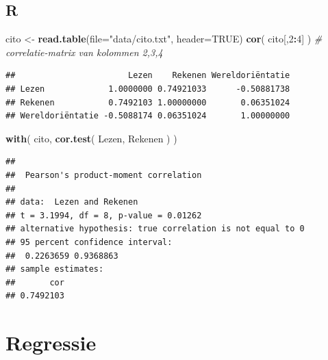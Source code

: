 \documentclass[
]{book}
\newenvironment{Shaded}{\begin{snugshade}}{\end{snugshade}}
\newcommand{\AttributeTok}[1]{\textcolor[rgb]{0.13,0.29,0.53}{#1}}
\newcommand{\CommentTok}[1]{\textcolor[rgb]{0.56,0.35,0.01}{\textit{#1}}}
\newcommand{\ConstantTok}[1]{\textcolor[rgb]{0.56,0.35,0.01}{#1}}
\newcommand{\DecValTok}[1]{\textcolor[rgb]{0.00,0.00,0.81}{#1}}
\newcommand{\FunctionTok}[1]{\textcolor[rgb]{0.13,0.29,0.53}{\textbf{#1}}}
\newcommand{\NormalTok}[1]{#1}
\newcommand{\OtherTok}[1]{\textcolor[rgb]{0.56,0.35,0.01}{#1}}
\newcommand{\SpecialCharTok}[1]{\textcolor[rgb]{0.81,0.36,0.00}{\textbf{#1}}}
\newcommand{\StringTok}[1]{\textcolor[rgb]{0.31,0.60,0.02}{#1}}
\begin{document}
\subsection{R}\label{r-7}

\begin{Shaded}
\begin{Highlighting}[]
\NormalTok{cito }\OtherTok{\textless{}{-}} \FunctionTok{read.table}\NormalTok{(}\AttributeTok{file=}\StringTok{"data/cito.txt"}\NormalTok{, }\AttributeTok{header=}\ConstantTok{TRUE}\NormalTok{)}
\FunctionTok{cor}\NormalTok{( cito[,}\DecValTok{2}\SpecialCharTok{:}\DecValTok{4}\NormalTok{] ) }\CommentTok{\# correlatie{-}matrix van kolommen 2,3,4}
\end{Highlighting}
\end{Shaded}

\begin{verbatim}
##                       Lezen    Rekenen Wereldoriëntatie
## Lezen             1.0000000 0.74921033      -0.50881738
## Rekenen           0.7492103 1.00000000       0.06351024
## Wereldoriëntatie -0.5088174 0.06351024       1.00000000
\end{verbatim}

\begin{Shaded}
\begin{Highlighting}[]
\FunctionTok{with}\NormalTok{( cito, }\FunctionTok{cor.test}\NormalTok{( Lezen, Rekenen ) )}
\end{Highlighting}
\end{Shaded}

\begin{verbatim}
## 
##  Pearson's product-moment correlation
## 
## data:  Lezen and Rekenen
## t = 3.1994, df = 8, p-value = 0.01262
## alternative hypothesis: true correlation is not equal to 0
## 95 percent confidence interval:
##  0.2263659 0.9368863
## sample estimates:
##       cor 
## 0.7492103
\end{verbatim}

\section{Regressie}\label{sec:regressie}
\end{document}
